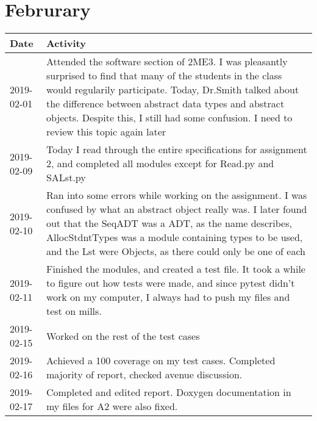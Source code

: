 \documentclass[12pt]{article}
\begin{document}
\section{Februrary}


 \begin{tabular}{|p{2cm}| p{12cm}|} 
 \hline
 Date & Activity  \\ 
 \hline
   2019-02-01 & Attended the software section of 2ME3. I was pleasantly surprised to find that many of the students in the class would regularily participate. Today, Dr.Smith talked about the difference between abstract data types and abstract objects. Despite this, I still had some confusion. I need to review this topic again later \\
 \hline
   2019-02-09 & Today I read through the entire specifications for assignment 2, and completed all modules except for Read.py and SALst.py \\
 \hline
    2019-02-10 & Ran into some errors while working on the assignment. I was confused by what an abstract object really was. I later found out that the SeqADT was a ADT, as the name describes, AllocStdntTypes was a module containing types to be used, and the Lst were Objects, as there could only be one of each \\
 \hline
   2019-02-11 & Finished the modules, and created a test file. It took a while to figure out how tests were made, and since pytest didn't work on my computer, I always had to push my files and test on mills. \\
 \hline
    2019-02-15 & Worked on the rest of the test cases \\
 \hline
    2019-02-16 & Achieved a 100 coverage on my test cases. Completed majority of report, checked avenue discussion.\\
 \hline
     2019-02-17 & Completed and edited report. Doxygen documentation in my files for A2 were also fixed. \\
 \hline
 
\end{tabular}
\end{document}
